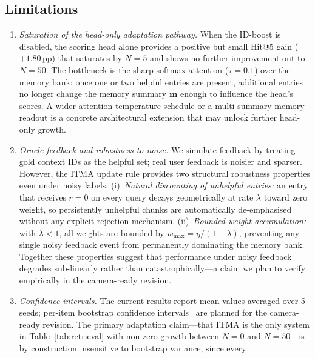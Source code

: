 \documentclass[journal]{IEEEtran}
\begin{document}
\subsection{Limitations}
\begin{enumerate}
  \item \emph{Saturation of the head-only adaptation pathway.}  When
        the ID-boost is disabled, the scoring head alone provides a
        positive but small Hit@5 gain ($+1.80$\,pp) that saturates by
        $N{=}5$ and shows no further improvement out to $N{=}50$.  The
        bottleneck is the sharp softmax attention ($\tau{=}0.1$) over
        the memory bank: once one or two helpful entries are present,
        additional entries no longer change the memory summary
        $\mathbf{m}$ enough to influence the head's scores.  A wider
        attention temperature schedule or a multi-summary memory
        readout is a concrete architectural extension that may unlock
        further head-only growth.
  \item \emph{Oracle feedback and robustness to noise.}  We simulate
        feedback by treating gold context IDs as the helpful set; real
        user feedback is noisier and sparser.  However, the ITMA
        update rule provides two structural robustness properties even
        under noisy labels.  (i)~\emph{Natural discounting of
        unhelpful entries:} an entry that receives $r=0$ on every
        query decays geometrically at rate $\lambda$ toward zero
        weight, so persistently unhelpful chunks are automatically
        de-emphasised without any explicit rejection mechanism.
        (ii)~\emph{Bounded weight accumulation:} with $\lambda{<}1$,
        all weights are bounded by $w_{\max}{=}\eta/(1-\lambda)$,
        preventing any single noisy feedback event from permanently
        dominating the memory bank.  Together these properties suggest
        that performance under noisy feedback degrades sub-linearly
        rather than catastrophically---a claim we plan to verify
        empirically in the camera-ready revision.
  \item \emph{Confidence intervals.}  The current results report mean
        values averaged over 5 seeds; per-item bootstrap confidence
        intervals~\cite{efron1993bootstrap} are planned for the
        camera-ready revision.  The primary adaptation claim---that
        ITMA is the only system in Table~\ref{tab:retrieval} with
        non-zero growth between $N{=}0$ and $N{=}50$---is by
        construction insensitive to bootstrap variance, since every

\end{enumerate}
\end{document}
